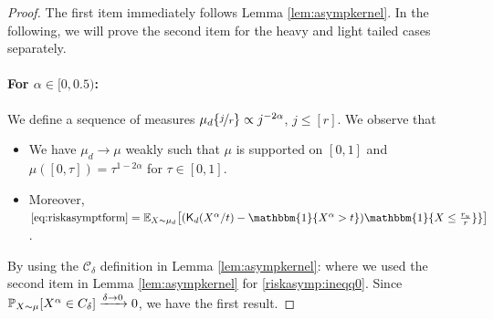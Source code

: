 \begin{proof}
The first item immediately follows Lemma \ref{lem:asympkernel}. In the following, we will prove the second item for the heavy and light tailed cases separately.
\paragraph{For $\alpha \in [0,0.5)$:} We define a sequence of measures $\mu_d \{  \nicefrac{j}{r}   \} \propto j^{- 2 \alpha}$,  $j \leq [r]$.  We observe that
\begin{itemize}
\item We have $\mu_d \to \mu$ weakly such that $\mu$ is supported on $[0,1]$ and $\mu([0,\tau]) =   \tau^{1 - 2\alpha}$ for $\tau \in [0,1]$.
\item Moreover,  $  \eqref{eq:riskasymptform} =   \E_{X \sim \mu_d} \big[ ( \mathsf{K}_d( X^{\alpha}/t ) -  \mathbbm{1} \{ X^{\alpha}  >  t  \}) \mathbbm{1} \{ X \leq \tfrac{\ru}{r}  \}  \}    \big]$.
\end{itemize}
By using the   $\mathcal{C}_{\delta}$ definition in Lemma \ref{lem:asympkernel}:
where we used the second item in Lemma \ref{lem:asympkernel} for \eqref{riskasymp:ineqq0}.  Since     $\mathbb{P}_{X \sim \mu}[ X^{\alpha}  \in C_{\delta} ] \xrightarrow{\delta \to 0} 0$, we have the first result.

\smallskip

\end{proof}
